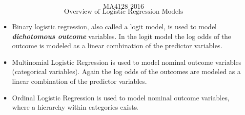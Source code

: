 \documentclass[00-GLMregslides.tex]{subfiles}
\begin{document}
	\begin{frame}
		\LARGE
		\[\mbox{MA4128 2016} \]
	\[	\mbox{Overview of Logistic Regression Models}\]
	\end{frame}
\begin{frame}
\Large
\begin{itemize}
\item Binary logistic regression, also called a logit model, is used to model \textbf{\textit{dichotomous outcome}} variables. In the logit model the log odds of the outcome is modeled as a linear combination of the predictor variables.

\end{itemize}
\end{frame}
\begin{frame}
\Large
\begin{itemize}
\item Multinomial Logistic Regression is used to model nominal outcome variables (categorical variables). 
Again the log odds of the outcomes are modeled as a linear combination of the predictor variables.
\smallskip
	\item Ordinal Logistic Regression is used to model nominal outcome variables, where a hierarchy within categories exists.
	
\end{itemize}
\end{frame}
\end{document}
